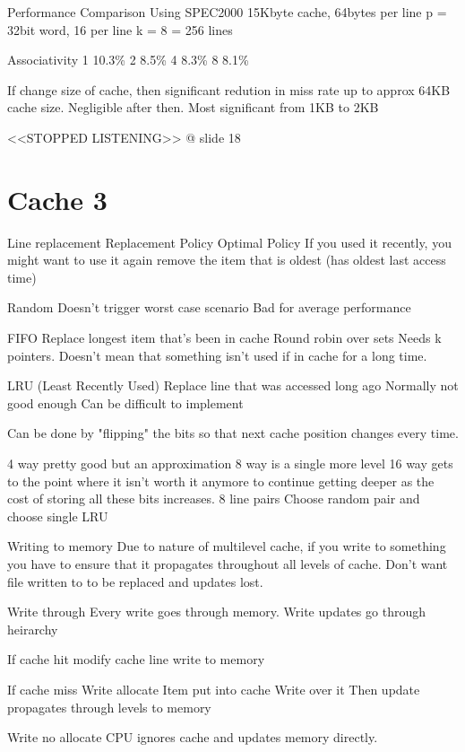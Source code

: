 \documentclass{article}
\begin{document}
Performance Comparison
	Using SPEC2000
	15Kbyte cache, 64bytes per line
	p = 32bit word, 16 per line
	k = 8 = 256 lines

	Associativity
	1	10.3\%
	2	8.5\%
	4	8.3\%
	8	8.1\%

	If change size of cache, then significant redution in miss rate up to approx 64KB cache size. Negligible after then. Most significant from 1KB to 2KB

	<<STOPPED LISTENING>> @ slide 18

\section{Cache 3}
	Line replacement
	Replacement Policy
		Optimal Policy
			If you used it recently, you might want to use it again
			remove the item that is oldest (has oldest last access time)

		Random
			Doesn't trigger worst case scenario
			Bad for average performance

		FIFO
			Replace longest item that's been in cache
			Round robin over sets
			Needs k pointers.
			Doesn't mean that something isn't used if in cache for a long time.

		LRU (Least Recently Used)
			Replace line that was accessed long ago
			Normally not good enough
			Can be difficult to implement

			Can be done by "flipping" the bits so that next cache position changes every time.

			4 way pretty good but an approximation
			8 way is a single more level
			16 way gets to the point where it isn't worth it anymore to continue getting deeper as the cost of storing all these bits increases.
				8 line pairs
				Choose random pair and choose single LRU

	Writing to memory
		Due to nature of multilevel cache, if you write to something you have to ensure that it propagates throughout all levels of cache.
		Don't want file written to to be replaced and updates lost.

		Write through
			Every write goes through memory. Write updates go through heirarchy

			If cache hit
				modify cache line
				write to memory

			If cache miss
				Write allocate
					Item put into cache
					Write over it
					Then update propagates through levels to memory

				Write no allocate
					CPU ignores cache and updates memory directly.
\end{document}
